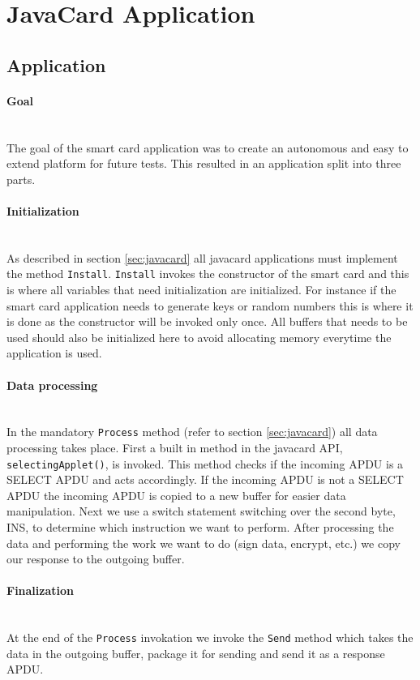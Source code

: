 \section{JavaCard Application}
\subsection{Application}
\paragraph{Goal}\mbox{}\\
The goal of the smart card application was to create an autonomous and easy to extend platform for future tests. This resulted in an application split into three parts.

\paragraph{Initialization}\mbox{}\\
As described in section \ref{sec:javacard} all javacard applications must implement the method \texttt{Install}. \texttt{Install} invokes the constructor of the smart card and this is where all variables that need initialization are initialized. For instance if the smart card application needs to generate keys or random numbers this is where it is done as the constructor will be invoked only once. All buffers that needs to be used should also be initialized here to avoid allocating memory everytime the application is used.

\paragraph{Data processing}\mbox{}\\
In the mandatory \texttt{Process} method (refer to section \ref{sec:javacard}) all data processing takes place. First a built in method in the javacard API, \texttt{selectingApplet()}, is invoked. This method checks if the incoming APDU is a SELECT APDU and acts accordingly. If the incoming APDU is not a SELECT APDU the incoming APDU is copied to a new buffer for easier data manipulation. Next we use a switch statement switching over the second byte, INS, to determine which instruction we want to perform. After processing the data and performing the work we want to do (sign data, encrypt, etc.) we copy our response to the outgoing buffer.

\paragraph{Finalization}\mbox{}\\
At the end of the \texttt{Process} invokation we invoke the \texttt{Send} method which takes the data in the outgoing buffer, package it for sending and send it as a response APDU.

